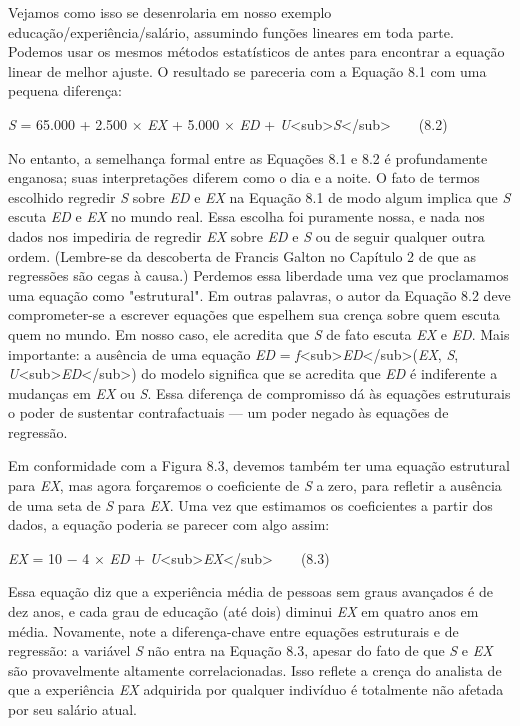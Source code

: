 \documentclass[11pt,a5paper,twoside]{book}
\begin{document}
Vejamos como isso se desenrolaria em nosso exemplo educação/experiência/salário, assumindo funções lineares em toda parte. Podemos usar os mesmos métodos estatísticos de antes para encontrar a equação linear de melhor ajuste. O resultado se pareceria com a Equação 8.1 com uma pequena diferença:

\textit{S} = 65.000 + 2.500 × \textit{EX} + 5.000 × \textit{ED} + \textit{U}<sub>\textit{S}</sub>  (8.2)

No entanto, a semelhança formal entre as Equações 8.1 e 8.2 é profundamente enganosa; suas interpretações diferem como o dia e a noite. O fato de termos escolhido regredir \textit{S} sobre \textit{ED} e \textit{EX} na Equação 8.1 de modo algum implica que \textit{S} escuta \textit{ED} e \textit{EX} no mundo real. Essa escolha foi puramente nossa, e nada nos dados nos impediria de regredir \textit{EX} sobre \textit{ED} e \textit{S} ou de seguir qualquer outra ordem. (Lembre-se da descoberta de Francis Galton no Capítulo 2 de que as regressões são cegas à causa.) Perdemos essa liberdade uma vez que proclamamos uma equação como "estrutural". Em outras palavras, o autor da Equação 8.2 deve comprometer-se a escrever equações que espelhem sua crença sobre quem escuta quem no mundo. Em nosso caso, ele acredita que \textit{S} de fato escuta \textit{EX} e \textit{ED}. Mais importante: a ausência de uma equação \textit{ED} = \textit{f}<sub>\textit{ED}</sub>(\textit{EX}, \textit{S}, \textit{U}<sub>\textit{ED}</sub>) do modelo significa que se acredita que \textit{ED} é indiferente a mudanças em \textit{EX} ou \textit{S}. Essa diferença de compromisso dá às equações estruturais o poder de sustentar contrafactuais — um poder negado às equações de regressão.

Em conformidade com a Figura 8.3, devemos também ter uma equação estrutural para \textit{EX}, mas agora forçaremos o coeficiente de \textit{S} a zero, para refletir a ausência de uma seta de \textit{S} para \textit{EX}. Uma vez que estimamos os coeficientes a partir dos dados, a equação poderia se parecer com algo assim:

\textit{EX} = 10 − 4 × \textit{ED} + \textit{U}<sub>\textit{EX}</sub>  (8.3)

Essa equação diz que a experiência média de pessoas sem graus avançados é de dez anos, e cada grau de educação (até dois) diminui \textit{EX} em quatro anos em média. Novamente, note a diferença-chave entre equações estruturais e de regressão: a variável \textit{S} não entra na Equação 8.3, apesar do fato de que \textit{S} e \textit{EX} são provavelmente altamente correlacionadas. Isso reflete a crença do analista de que a experiência \textit{EX} adquirida por qualquer indivíduo é totalmente não afetada por seu salário atual.
\end{document}
